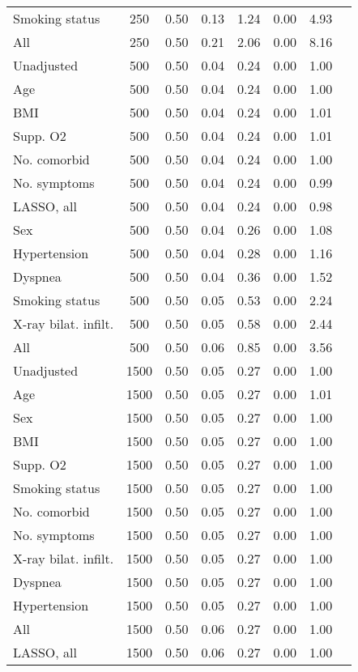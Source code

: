 \documentclass{article}
\begin{document}
{\begin{longtable}{lccccccc}
Smoking status & 250 & 0.50 & 0.13 & 1.24 &  0.00 &  4.93 \\ 
All & 250 & 0.50 & 0.21 & 2.06 &  0.00 &  8.16 \\ \midrule 
Unadjusted & 500 & 0.50 & 0.04 & 0.24 &  0.00 &  1.00 \\ 
Age & 500 & 0.50 & 0.04 & 0.24 &  0.00 &  1.00 \\ 
BMI & 500 & 0.50 & 0.04 & 0.24 &  0.00 &  1.01 \\ 
Supp. O2 & 500 & 0.50 & 0.04 & 0.24 &  0.00 &  1.01 \\ 
No. comorbid & 500 & 0.50 & 0.04 & 0.24 &  0.00 &  1.00 \\ 
No. symptoms & 500 & 0.50 & 0.04 & 0.24 &  0.00 &  0.99 \\ 
LASSO, all & 500 & 0.50 & 0.04 & 0.24 &  0.00 &  0.98 \\ 
Sex & 500 & 0.50 & 0.04 & 0.26 &  0.00 &  1.08 \\ 
Hypertension & 500 & 0.50 & 0.04 & 0.28 &  0.00 &  1.16 \\ 
Dyspnea & 500 & 0.50 & 0.04 & 0.36 &  0.00 &  1.52 \\ 
Smoking status & 500 & 0.50 & 0.05 & 0.53 &  0.00 &  2.24 \\ 
X-ray bilat. infilt. & 500 & 0.50 & 0.05 & 0.58 &  0.00 &  2.44 \\ 
All & 500 & 0.50 & 0.06 & 0.85 &  0.00 &  3.56 \\ \midrule 
Unadjusted & 1500 & 0.50 & 0.05 & 0.27 &  0.00 &  1.00 \\ 
Age & 1500 & 0.50 & 0.05 & 0.27 &  0.00 &  1.01 \\ 
Sex & 1500 & 0.50 & 0.05 & 0.27 &  0.00 &  1.00 \\ 
BMI & 1500 & 0.50 & 0.05 & 0.27 &  0.00 &  1.00 \\ 
Supp. O2 & 1500 & 0.50 & 0.05 & 0.27 &  0.00 &  1.00 \\ 
Smoking status & 1500 & 0.50 & 0.05 & 0.27 &  0.00 &  1.00 \\ 
No. comorbid & 1500 & 0.50 & 0.05 & 0.27 &  0.00 &  1.00 \\ 
No. symptoms & 1500 & 0.50 & 0.05 & 0.27 &  0.00 &  1.00 \\ 
X-ray bilat. infilt. & 1500 & 0.50 & 0.05 & 0.27 &  0.00 &  1.00 \\ 
Dyspnea & 1500 & 0.50 & 0.05 & 0.27 &  0.00 &  1.00 \\ 
Hypertension & 1500 & 0.50 & 0.05 & 0.27 &  0.00 &  1.00 \\ 
All & 1500 & 0.50 & 0.06 & 0.27 &  0.00 &  1.00 \\ 
LASSO, all & 1500 & 0.50 & 0.06 & 0.27 &  0.00 &  1.00 \\
\bottomrule
\hline
\end{longtable}
}
\end{document}
